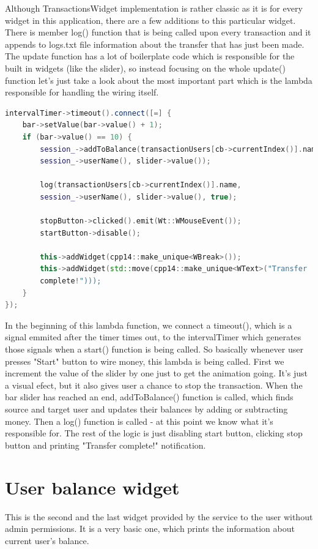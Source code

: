\documentclass[a4paper,12pt]{book}
\begin{document}
{{\bigskip 
Although TransactionsWidget implementation is rather classic as it is for every widget in this application, there are a few additions to this particular widget. There is member log() function that is being called upon every transaction and it appends to logs.txt file information about the transfer that has just been made. The update function has a lot of boilerplate code which is responsible for the built in widgets (like the slider), so instead focusing on the whole update() function let's just take a look about the most important part which is the lambda responsible for handling the wiring itself.

\bigskip
\begin{lstlisting}[frame=single, basicstyle=\small, language=C++, caption={Part of TransactionWidget::update() function.}, captionpos=b]
intervalTimer->timeout().connect([=] {
	bar->setValue(bar->value() + 1);
	if (bar->value() == 10) {
		session_->addToBalance(transactionUsers[cb->currentIndex()].name,
		session_->userName(), slider->value());
		
		log(transactionUsers[cb->currentIndex()].name, 
		session_->userName(), slider->value(), true);
		
		stopButton->clicked().emit(Wt::WMouseEvent());
		startButton->disable();
		
		this->addWidget(cpp14::make_unique<WBreak>());
		this->addWidget(std::move(cpp14::make_unique<WText>("Transfer 
		complete!")));
	}
});
\end{lstlisting}

In the beginning of this lambda function, we connect a timeout(), which is a signal emmited after the timer times out, to the intervalTimer which generates those signals when a start() function is being called. So basically whenever user presses "Start" button to wire money, this lambda is being called. First we increment the value of the slider by one just to get the animation going. It's just a visual efect, but it also gives user a chance to stop the transaction. When the bar slider has reached an end, addToBalance() function is called, which finds source and target user and updates their balances by adding or subtracting money. Then a log() function is called - at this point we know what it's responsible for. The rest of the logic is just disabling start button, clicking stop button and printing "Transfer complete!" notification.
}

\section*{User balance widget}
{
This is the second and the last widget provided by the service to the user without admin permissions. It is a very basic one, which prints the information about current user's balance.

}}
\end{document}
